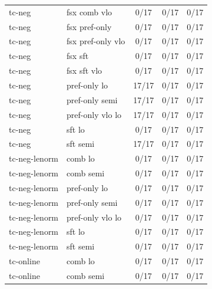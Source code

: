 \documentclass[10pt,landscape]{article}
\begin{document}
\begin{tabular}{llccc}
tc-neg & fsx comb vlo & \cellcolor{missing}0/17 & \cellcolor{missing}0/17 & \cellcolor{missing}0/17 \\
tc-neg & fsx pref-only & \cellcolor{missing}0/17 & \cellcolor{missing}0/17 & \cellcolor{missing}0/17 \\
tc-neg & fsx pref-only vlo & \cellcolor{missing}0/17 & \cellcolor{missing}0/17 & \cellcolor{missing}0/17 \\
tc-neg & fsx sft & \cellcolor{missing}0/17 & \cellcolor{missing}0/17 & \cellcolor{missing}0/17 \\
tc-neg & fsx sft vlo & \cellcolor{missing}0/17 & \cellcolor{missing}0/17 & \cellcolor{missing}0/17 \\
tc-neg & pref-only lo & \cellcolor{done}17/17 & \cellcolor{missing}0/17 & \cellcolor{missing}0/17 \\
tc-neg & pref-only semi & \cellcolor{done}17/17 & \cellcolor{missing}0/17 & \cellcolor{missing}0/17 \\
tc-neg & pref-only vlo lo & \cellcolor{done}17/17 & \cellcolor{missing}0/17 & \cellcolor{missing}0/17 \\
tc-neg & sft lo & \cellcolor{missing}0/17 & \cellcolor{missing}0/17 & \cellcolor{missing}0/17 \\
tc-neg & sft semi & \cellcolor{done}17/17 & \cellcolor{missing}0/17 & \cellcolor{missing}0/17 \\
tc-neg-lenorm & comb lo & \cellcolor{missing}0/17 & \cellcolor{missing}0/17 & \cellcolor{missing}0/17 \\
tc-neg-lenorm & comb semi & \cellcolor{missing}0/17 & \cellcolor{missing}0/17 & \cellcolor{missing}0/17 \\
tc-neg-lenorm & pref-only lo & \cellcolor{missing}0/17 & \cellcolor{missing}0/17 & \cellcolor{missing}0/17 \\
tc-neg-lenorm & pref-only semi & \cellcolor{missing}0/17 & \cellcolor{missing}0/17 & \cellcolor{missing}0/17 \\
tc-neg-lenorm & pref-only vlo lo & \cellcolor{missing}0/17 & \cellcolor{missing}0/17 & \cellcolor{missing}0/17 \\
tc-neg-lenorm & sft lo & \cellcolor{missing}0/17 & \cellcolor{missing}0/17 & \cellcolor{missing}0/17 \\
tc-neg-lenorm & sft semi & \cellcolor{missing}0/17 & \cellcolor{missing}0/17 & \cellcolor{missing}0/17 \\
tc-online & comb lo & \cellcolor{missing}0/17 & \cellcolor{missing}0/17 & \cellcolor{missing}0/17 \\
tc-online & comb semi & \cellcolor{missing}0/17 & \cellcolor{missing}0/17 & \cellcolor{missing}0/17 \\

\end{tabular}
\end{document}
